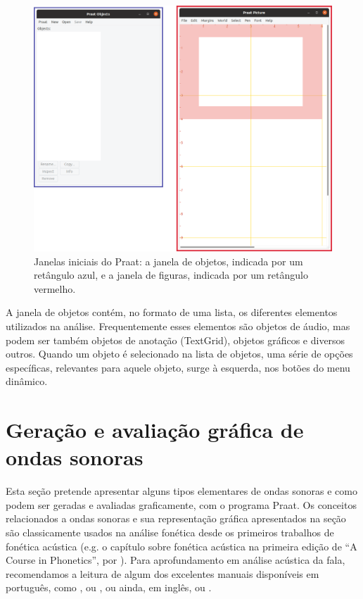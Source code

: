 \documentclass[portuguese]{textolivre}
\begin{document}
\begin{figure}[H]
 \centering
 \includegraphics[width=1.0\textwidth]{Fig3.png}
 \caption{Janelas iniciais do Praat: a janela de objetos, indicada por um retângulo azul, e a janela de figuras, indicada por um retângulo vermelho.}
 \label{fig3}
\end{figure}

A janela de objetos contém, no formato de uma lista, os diferentes elementos utilizados na análise. Frequentemente esses elementos são objetos de áudio, mas podem ser também objetos de anotação (TextGrid), objetos gráficos e diversos outros. Quando um objeto é selecionado na lista de objetos, uma série de opções específicas, relevantes para aquele objeto, surge à esquerda, nos botões do menu dinâmico.
  

\section{Geração e avaliação gráfica de ondas sonoras}\label{sec-intro-acustica}
Esta seção pretende apresentar alguns tipos elementares de ondas sonoras e como podem ser geradas e avaliadas graficamente, com o programa Praat. Os conceitos relacionados a ondas sonoras e sua representação gráfica apresentados na seção são classicamente usados na análise fonética desde os primeiros trabalhos de fonética acústica (e.g. o capítulo sobre fonética acústica na primeira edição de ``A Course in Phonetics'', por \textcite{ladefoged1975}). Para aprofundamento em análise acústica da fala, recomendamos a leitura de algum dos excelentes manuais disponíveis em português, como \textcite{cristofaro_etal_2019}, \textcite{barbosa_madureira_2015} ou \textcite{kent_read}, ou ainda, em inglês, \textcite{reetz_jongman_2011} ou \textcite{ladefoged_johnson_2014}.
\end{document}
